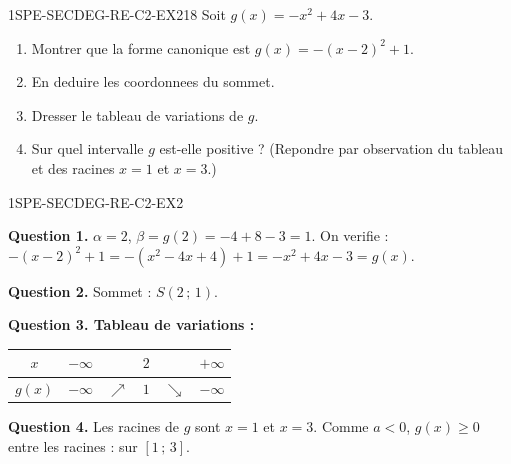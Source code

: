 
\begin{exercice}{1SPE-SECDEG-RE-C2-EX2}{1}{8}
Soit $g(x) = -x^2 + 4x - 3$.
\begin{enumerate}
  \item Montrer que la forme canonique est $g(x) = -(x-2)^2 + 1$.
  \item En deduire les coordonnees du sommet.
  \item Dresser le tableau de variations de $g$.
  \item Sur quel intervalle $g$ est-elle positive ? (Repondre par observation du tableau et des racines $x = 1$ et $x = 3$.)
\end{enumerate}
\end{exercice}



\begin{corrige}{1SPE-SECDEG-RE-C2-EX2}

\textbf{Question 1.} $\alpha = 2$, $\beta = g(2) = -4 + 8 - 3 = 1$. On verifie : $-(x-2)^2 + 1 = -(x^2-4x+4)+1 = -x^2+4x-3 = g(x)$. \checkmark

\textbf{Question 2.} Sommet : $S(2\,;\,1)$.


\textbf{Question 3. Tableau de variations :}

\begin{center}
\begin{tabular}{|c|ccccc|}
\hline
$x$ & $-\infty$ & & $2$ & & $+\infty$ \\
\hline
$g(x)$ & $-\infty$ & $\nearrow$ & $1$ & $\searrow$ & $-\infty$ \\
\hline
\end{tabular}
\end{center}

\textbf{Question 4.} Les racines de $g$ sont $x = 1$ et $x = 3$. Comme $a < 0$, $g(x) \geq 0$ entre les racines : sur $[1\,;\,3]$.

\end{corrige}

